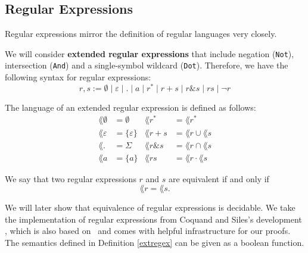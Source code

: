     \subsection{Regular Expressions}

     
    Regular expressions mirror the definition of regular languages very closely. 
    \begin{definition}
        \label{extregex}
    We will consider \textbf{extended regular expressions} that include negation (\lstinline{Not}), intersection (\lstinline{And}) and a single-symbol wildcard (\lstinline{Dot}). 
    Therefore, we have the following syntax for regular expressions:
    \begin{equation*}
        r,s := \emptyset \; | \; \varepsilon \; | \; . \; | \; a \; | \; r^* \; | \; r + s \; | \; r \& s \; | \; r s \; | \; \neg r
    \end{equation*}
        

     
    The language of an extended regular expression is defined as follows:
    \begin{align*}
        \lang{\emptyset} & = \emptyset
        & 
        \lang{r^*} & = \lang{r}^* \\
        \lang{\varepsilon} & = \{\varepsilon\}
        & 
        \lang{r + s} & = \lang{r} \cup \lang{s} \\
        \lang{.} & = \Sigma
        & 
        \lang{r \& s} & = \lang{r} \cap \lang{s} \\
        \lang{a} & = \{a\}
        &
        \lang{r s} & = \lang{r} \cdot \lang{s}
    \end{align*}
    \end{definition}

    \begin{definition}
        We say that two regular expressions $r$ and $s$ are equivalent if and only if
        \begin{equation*}
            \lang{r} = \lang{s}.
        \end{equation*}
    \end{definition}
We will later show that equivalence of regular expressions is decidable.
We take the implementation of regular expressions from Coquand and Siles's development \cite{DBLP:conf/cpp/CoquandS11}, which is also based on \ssreflect\ and comes with helpful infrastructure for our proofs.
The semantics defined in Definition \ref{extregex} can be given as a boolean function.
    

